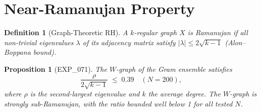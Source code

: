 \documentclass[11pt]{article}
\newtheorem{definition}[theorem]{Definition}
\newtheorem{proposition}[theorem]{Proposition}
\begin{document}
\section{Near-Ramanujan Property}

\begin{definition}[Graph-Theoretic RH]
A $k$-regular graph $X$ is \emph{Ramanujan} if all non-trivial
eigenvalues $\lambda$ of its adjacency matrix satisfy
$|\lambda| \leq 2\sqrt{k-1}$ (Alon--Boppana bound).
\end{definition}

\begin{proposition}[EXP\_071]
The $W$-graph of the Gram ensemble satisfies
\[
  \frac{\rho}{2\sqrt{k-1}} \;\leq\; 0.39 \quad (N = 200),
\]
where $\rho$ is the second-largest eigenvalue and $k$ the average degree.
The $W$-graph is strongly sub-Ramanujan, with the ratio
bounded well below 1 for all tested $N$.
\end{proposition}
\end{document}

